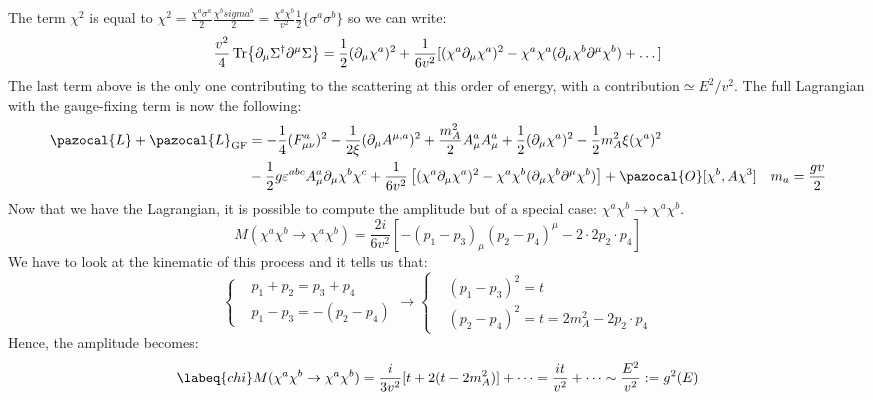 \documentclass[../main.tex]{subfiles}
\begin{document}
The term $\chi^2$ is equal to $\chi^2=\frac{\chi^a\sigma^a}{2}\frac{\chi^bsigma^b}{2}=\frac{\chi^a\chi^b}{v^2}\frac{1}{2}\{\sigma^a\sigma^b\}$ so we can write:
\[
\frac{v^2}{4}\Tr{\partial_\mu\Sigma^\dagger\partial^\mu\Sigma}=\frac{1}{2}(\partial_\mu\chi^a)^2+\frac{1}{6v^2}[(\chi^a\partial_\mu\chi^a)^2-\chi^a\chi^a(\partial_\mu\chi^b\partial^\mu\chi^b)+\dots]
\]
The last term above is the only one contributing to the scattering at this order of energy, with a contribution$\simeq E^2/v^2$. The full Lagrangian with the gauge-fixing term is now the following:
\begin{align*}
\pazocal{L}+\pazocal{L}_{\text{GF}}&=-\frac{1}{4}(F_{\mu\nu}^a)^2-\frac{1}{2\xi}(\partial_\mu A^{\mu,a})^2+\frac{m_A^2}{2}A_\mu^aA_\mu^a+\frac{1}{2}(\partial_\mu\chi^a)^2-\frac{1}{2}m_A^2\xi(\chi^a)^2\\
&-\frac{1}{2}g\varepsilon^{abc}A_\mu^a\partial_\mu\chi^b\chi^c+\frac{1}{6v^2}\left[(\chi^a\partial_\mu\chi^a)^2-\chi^a\chi^b(\partial_\mu\chi^b\partial^\mu\chi^b)\right]+\pazocal{O}[\chi^b,A\chi^3] \quad m_a=\frac{gv}{2}
\end{align*}
Now that we have the Lagrangian, it is possible to compute the amplitude but of a special case: $\chi^a\chi^b\to\chi^a\chi^b$.
\[
M(\chi^a\chi^b\to\chi^a\chi^b)=\frac{2i}{6v^2}[-(p_1-p_3)_\mu(p_2-p_4)^\mu-2\cdot2p_2\cdot p_4]
\]
We have to look at the kinematic of this process and it tells us that:
\[
\left\{
\begin{aligned}
&p_1+p_2=p_3+p_4\\
&p_1-p_3=-(p_2-p_4)
\end{aligned}
\right.
\to
\left\{
\begin{aligned}
&(p_1-p_3)^2=t\\
&(p_2-p_4)^2=t=2m_A^2-2p_2\cdot p_4
\end{aligned}
\right.
\]
Hence, the amplitude becomes:
\begin{equation}
\labeq{chi}
M(\chi^a\chi^b\to\chi^a\chi^b)=\frac{i}{3v^2}[t+2(t-2m_A^2)]+\dots=\frac{it}{v^2}+\dots\sim\frac{E^2}{v^2}:=g^2(E)
\end{equation}
\end{document}
